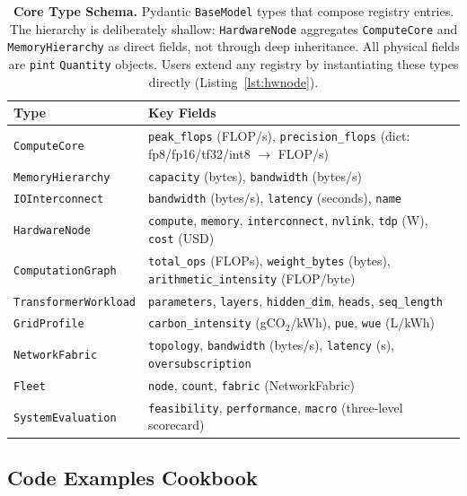 \documentclass[10pt,twocolumn]{article}
\begin{document}
\begin{table}[!t]
\centering
\small
\renewcommand{\arraystretch}{1.08}
\caption{\textbf{Core Type Schema.} Pydantic \texttt{BaseModel} types that compose registry entries. The hierarchy is deliberately shallow: \texttt{HardwareNode} aggregates \texttt{ComputeCore} and \texttt{MemoryHierarchy} as direct fields, not through deep inheritance. All physical fields are \texttt{pint} \texttt{Quantity} objects. Users extend any registry by instantiating these types directly (Listing~\ref{lst:hwnode}).}
\label{tab:type-schema}
\begin{tabularx}{\textwidth}{@{}l X@{}}
\toprule
\textbf{Type} & \textbf{Key Fields} \\
\midrule
\texttt{ComputeCore}       & \texttt{peak\_flops} (FLOP/s), \texttt{precision\_flops} (dict: fp8/fp16/tf32/int8 $\to$ FLOP/s) \\
\texttt{MemoryHierarchy}   & \texttt{capacity} (bytes), \texttt{bandwidth} (bytes/s) \\
\texttt{IOInterconnect}    & \texttt{bandwidth} (bytes/s), \texttt{latency} (seconds), \texttt{name} \\
\texttt{HardwareNode}      & \texttt{compute}, \texttt{memory}, \texttt{interconnect}, \texttt{nvlink}, \texttt{tdp} (W), \texttt{cost} (USD) \\
\texttt{ComputationGraph}  & \texttt{total\_ops} (FLOPs), \texttt{weight\_bytes} (bytes), \texttt{arithmetic\_intensity} (FLOP/byte) \\
\texttt{TransformerWorkload} & \texttt{parameters}, \texttt{layers}, \texttt{hidden\_dim}, \texttt{heads}, \texttt{seq\_length} \\
\texttt{GridProfile}       & \texttt{carbon\_intensity} (gCO$_2$/kWh), \texttt{pue}, \texttt{wue} (L/kWh) \\
\texttt{NetworkFabric}     & \texttt{topology}, \texttt{bandwidth} (bytes/s), \texttt{latency} (s), \texttt{oversubscription} \\
\texttt{Fleet}             & \texttt{node}, \texttt{count}, \texttt{fabric} (NetworkFabric) \\
\texttt{SystemEvaluation}  & \texttt{feasibility}, \texttt{performance}, \texttt{macro} (three-level scorecard) \\
\bottomrule
\end{tabularx}
\end{table}

\subsection{Code Examples Cookbook}
\end{document}
